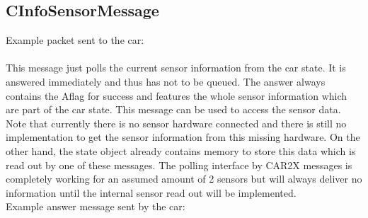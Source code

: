 \subsection*{CInfoSensorMessage}
Example packet sent to the car:\\
 \\
\newline
\newline
This message just polls the current sensor information from the car state. It is answered immediately and thus has not to be queued. The answer always contains the \glqq A\grqq flag for success and features the whole sensor information which are part of the car state. This message can be used to access the sensor data. Note that currently there is no sensor hardware connected and there is still no implementation to get the sensor information from this missing hardware. On the other hand, the state object already contains memory to store this data which is read out by one of these messages. The polling interface by CAR2X messages is completely working for an assumed amount of 2 sensors but will always deliver no information until the internal sensor read out will be implemented.\\
\newline
Example answer message sent by the car:\\
\\
\newline
